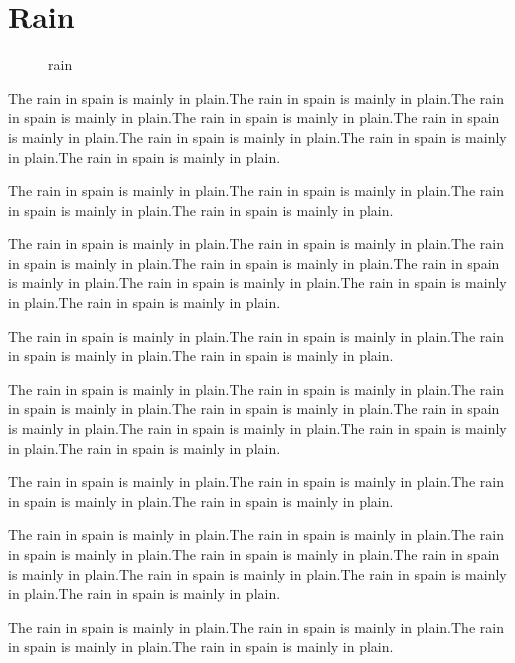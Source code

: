 \documentclass[a5]{book}
\begin{document}
\chapter{Rain}

\begin{figure}[b]
  \caption{rain}
\end{figure}

The rain in spain is mainly in plain.The rain in spain is mainly in plain.The rain in spain is mainly in plain.The rain in spain is mainly in plain.The rain in spain is mainly in plain.The rain in spain is mainly in plain.The rain in spain is mainly in plain.The rain in spain is mainly in plain.

The rain in spain is mainly in plain.The rain in spain is mainly in plain.The rain in spain is mainly in plain.The rain in spain is mainly in plain.

The rain in spain is mainly in plain.The rain in spain is mainly in plain.The rain in spain is mainly in plain.The rain in spain is mainly in plain.The rain in spain is mainly in plain.The rain in spain is mainly in plain.The rain in spain is mainly in plain.The rain in spain is mainly in plain.

The rain in spain is mainly in plain.The rain in spain is mainly in plain.The rain in spain is mainly in plain.The rain in spain is mainly in plain.

The rain in spain is mainly in plain.The rain in spain is mainly in plain.The rain in spain is mainly in plain.The rain in spain is mainly in plain.The rain in spain is mainly in plain.The rain in spain is mainly in plain.The rain in spain is mainly in plain.The rain in spain is mainly in plain.

The rain in spain is mainly in plain.The rain in spain is mainly in plain.The rain in spain is mainly in plain.The rain in spain is mainly in plain.

The rain in spain is mainly in plain.The rain in spain is mainly in plain.The rain in spain is mainly in plain.The rain in spain is mainly in plain.The rain in spain is mainly in plain.The rain in spain is mainly in plain.The rain in spain is mainly in plain.The rain in spain is mainly in plain.

The rain in spain is mainly in plain.The rain in spain is mainly in plain.The rain in spain is mainly in plain.The rain in spain is mainly in plain.



\end{document}
